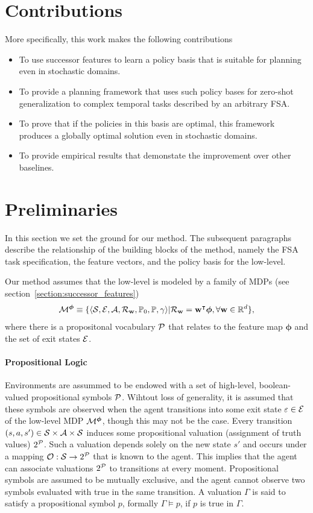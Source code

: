 \section{Contributions}
More specifically, this work makes the following contributions
 \begin{itemize}
    \item To use successor features to learn a policy basis that is suitable for planning even in stochastic domains.
    \item To provide a planning framework that uses such policy bases for zero-shot generalization to complex temporal tasks described by an arbitrary FSA.
    \item To prove that if the policies in this basis are optimal, this framework produces a globally optimal solution even in stochastic domains.
    \item To provide empirical results that demonstate the improvement over other baselines.
\end{itemize}

\section{Preliminaries}

In this section we set the ground for our method. The subsequent paragraphs describe the relationship of the building blocks of the method, namely the FSA task specification, the feature vectors, and the policy basis for the low-level.

Our method assumes that the low-level is modeled by a family of MDPs (see section~\ref{section:successor_features})
\begin{equation}
  \mathcal{M}^{\boldsymbol{\phi}}\equiv\{\langle\mathcal{S},\mathcal{E},\mathcal{A},\mathcal{R}_{\mathbf{w}},\mathbb{P}_0, \mathbb{P},\gamma\rangle \lvert \mathcal{R}_{\mathbf{w}} = \mathbf{w}^\intercal \boldsymbol{\phi}, \forall\mathbf{w}\in\mathbb{R}^d\},
\end{equation}
where there is a propositonal vocabulary $\mathcal{P}$ that relates to the feature map $\boldsymbol{\phi}$ and the set of exit states $\mathcal{E}$. 

\paragraph{Propositional Logic} Environments are assummed to be endowed with a set of high-level, boolean-valued propositional symbols $\mathcal{P}$. Wihtout loss of generality, it is assumed that these symbols are observed when the agent transitions into some exit state $\varepsilon\in\mathcal{E}$ of the low-level MDP $\mathcal{M}^{\boldsymbol{\phi}}$, though this may not be the case. Every transition $(s, a, s')\in\mathcal{S}\times\mathcal{A}\times\mathcal{S}$ induces some propositional valuation (assignment of truth values) $2^{\mathcal{P}}$. Such a valuation depends solely on the new state $s'$ and occurs under a mapping ${\mathcal{O}:\mathcal{S}\rightarrow2^{\mathcal{P}}}$ that is known to the agent. This implies that the agent can associate valuations $2^{\mathcal{P}}$ to transitions at every moment. Propositional symbols are assumed to be mutually exclusive, and the agent cannot observe two symbols evaluated with true in the same transition. A valuation $\Gamma$ is said to satisfy a propositional symbol $p$, formally $\Gamma\vDash p$, if $p$ is true in $\Gamma$. 

